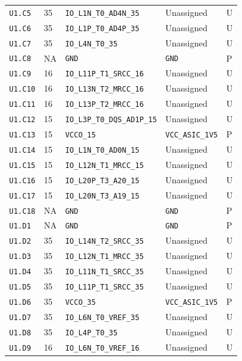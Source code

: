 \documentclass[11pt,a4paper]{article}
\begin{document}
\begin{longtable}{@{}P{20mm}P{10mm}P{75mm}P{49mm}P{7mm}@{}}
\nolinkurl{U1.C5} & 35 & \nolinkurl{IO_L1N_T0_AD4N_35} & Unassigned & U \\
\nolinkurl{U1.C6} & 35 & \nolinkurl{IO_L1P_T0_AD4P_35} & Unassigned & U \\
\nolinkurl{U1.C7} & 35 & \nolinkurl{IO_L4N_T0_35} & Unassigned & U \\
\nolinkurl{U1.C8} & NA & \nolinkurl{GND} & \nolinkurl{GND} & P \\
\nolinkurl{U1.C9} & 16 & \nolinkurl{IO_L11P_T1_SRCC_16} & Unassigned & U \\
\nolinkurl{U1.C10} & 16 & \nolinkurl{IO_L13N_T2_MRCC_16} & Unassigned & U \\
\nolinkurl{U1.C11} & 16 & \nolinkurl{IO_L13P_T2_MRCC_16} & Unassigned & U \\
\nolinkurl{U1.C12} & 15 & \nolinkurl{IO_L3P_T0_DQS_AD1P_15} & Unassigned & U \\
\nolinkurl{U1.C13} & 15 & \nolinkurl{VCCO_15} & \nolinkurl{VCC_ASIC_1V5} & P \\
\nolinkurl{U1.C14} & 15 & \nolinkurl{IO_L1N_T0_AD0N_15} & Unassigned & U \\
\nolinkurl{U1.C15} & 15 & \nolinkurl{IO_L12N_T1_MRCC_15} & Unassigned & U \\
\nolinkurl{U1.C16} & 15 & \nolinkurl{IO_L20P_T3_A20_15} & Unassigned & U \\
\nolinkurl{U1.C17} & 15 & \nolinkurl{IO_L20N_T3_A19_15} & Unassigned & U \\
\nolinkurl{U1.C18} & NA & \nolinkurl{GND} & \nolinkurl{GND} & P \\
\nolinkurl{U1.D1} & NA & \nolinkurl{GND} & \nolinkurl{GND} & P \\
\nolinkurl{U1.D2} & 35 & \nolinkurl{IO_L14N_T2_SRCC_35} & Unassigned & U \\
\nolinkurl{U1.D3} & 35 & \nolinkurl{IO_L12N_T1_MRCC_35} & Unassigned & U \\
\nolinkurl{U1.D4} & 35 & \nolinkurl{IO_L11N_T1_SRCC_35} & Unassigned & U \\
\nolinkurl{U1.D5} & 35 & \nolinkurl{IO_L11P_T1_SRCC_35} & Unassigned & U \\
\nolinkurl{U1.D6} & 35 & \nolinkurl{VCCO_35} & \nolinkurl{VCC_ASIC_1V5} & P \\
\nolinkurl{U1.D7} & 35 & \nolinkurl{IO_L6N_T0_VREF_35} & Unassigned & U \\
\nolinkurl{U1.D8} & 35 & \nolinkurl{IO_L4P_T0_35} & Unassigned & U \\
\nolinkurl{U1.D9} & 16 & \nolinkurl{IO_L6N_T0_VREF_16} & Unassigned & U \\

\end{longtable}
\end{document}
